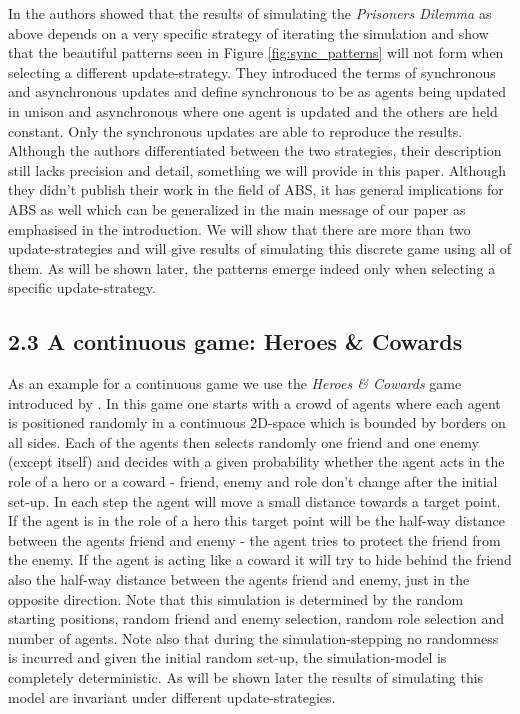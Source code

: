 In \cite{huberman_evolutionary_1993} the authors showed that the results of simulating the \textit{Prisoners Dilemma} as above depends on a very specific strategy of iterating the simulation and show that the beautiful patterns seen in Figure \ref{fig:sync_patterns} will not form when selecting a different update-strategy. They introduced the terms of synchronous and asynchronous updates and define synchronous to be as agents being updated in unison and asynchronous where one agent is updated and the others are held constant. Only the synchronous updates are able to reproduce the results. Although the authors differentiated between the two strategies, their description still lacks precision and detail, something we will provide in this paper. Although they didn't publish their work in the field of ABS, it has general implications for ABS as well which can be generalized in the main message of our paper as emphasised in the introduction. We will show that there are more than two update-strategies and will give results of simulating this discrete game using all of them. As will be shown later, the patterns emerge indeed only when selecting a specific update-strategy.

\subsection{2.3 A continuous game: Heroes \& Cowards}
As an example for a continuous game we use the \textit{Heroes \& Cowards} game introduced by \cite{wilensky_introduction_2015}. In this game one starts with a crowd of agents where each agent is positioned randomly in a continuous 2D-space which is bounded by borders on all sides. Each of the agents then selects randomly one friend and one enemy (except itself) and decides with a given probability whether the agent acts in the role of a hero or a coward - friend, enemy and role don't change after the initial set-up. In each step the agent will move a small distance towards a target point. If the agent is in the role of a hero this target point will be the half-way distance between the agents friend and enemy - the agent tries to protect the friend from the enemy. If the agent is acting like a coward it will try to hide behind the friend also the half-way distance between the agents friend and enemy, just in the opposite direction. Note that this simulation is determined by the random starting positions, random friend and enemy selection, random role selection and number of agents. Note also that during the simulation-stepping no randomness is incurred and given the initial random set-up, the simulation-model is completely deterministic. As will be shown later the results of simulating this model are invariant under different update-strategies.

